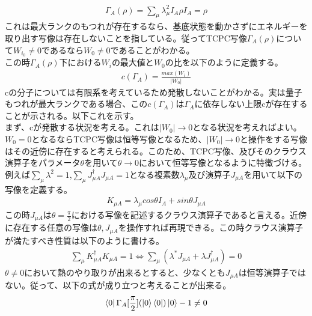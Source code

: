 \documentclass[a4paper,10.5pt]{article}
\numberwithin{equation}{section}
\begin{document}
\begin{equation}\begin{split}
    \Gamma_{A}(\rho)=\sum_{\mu}\lambda_{\mu}^{2}I_{A}\rho I_{A}
    =\rho
\end{split} \end{equation}
これは最大ランクのもつれが存在するなら、基底状態を動かさずにエネルギーを取り出す写像は存在しないことを指している。従ってTCPC写像$\Gamma_{A}(\rho)$について$W_{i_{0}}\neq 0$であるなら$W_{0}\neq 0$であることがわかる。\\
この時$\Gamma_{A}(\rho)$下における$W_{i}$の最大値と$W_{0}$の比を以下のように定義する。
\begin{equation}\begin{split}
    c(\Gamma_{A})=\frac{max(W_{i})}{|W_{0}|} \label{c}
\end{split} \end{equation}
cの分子については有限系を考えているため発散しないことがわかる。実は量子もつれが最大ランクである場合、この$c(\Gamma_{A})$は$\Gamma_{A}$に依存しない上限cが存在することが示される。以下これを示す。\\
まず、cが発散する状況を考える。これは$|W_{0}|\to 0$となる状況を考えればよい。$W_{0}=0$となるならTCPC写像は恒等写像となるため、$|W_{0}|\to 0$と操作をする写像はその近傍に存在すると考えられる。このため、TCPC写像、及びそのクラウス演算子をパラメータ$\theta$を用いて$\theta \to 0$において恒等写像となるように特徴づける。例えば$\sum_{\mu}\lambda^{2}=1$,$\sum_{\mu}J_{\mu A}^{\dagger} J_{\mu A}=1$となる複素数$\lambda_{\mu}$及び演算子$J_{\mu A}$を用いて以下の写像を定義する。
\begin{equation}\begin{split}
    K_{\mu A} = \lambda_{\mu}cos\theta I_{A} + sin\theta J_{\mu A}
\end{split} \end{equation}
この時$J_{\mu A}$は$\theta=\frac{\pi}{2}$における写像を記述するクラウス演算子であると言える。近傍に存在する任意の写像は$\theta,J_{\mu A}$を操作すれば再現できる。この時クラウス演算子が満たすべき性質は以下のように書ける。
\begin{equation}\begin{split}
    \sum_{\mu}K_{\mu A}^{\dagger}K_{\mu A}=1 
    \iff \sum_{\mu}(\lambda^{*}J_{\mu A}+\lambda J^{\dagger}_{\mu A})=0
\end{split} \end{equation}
$\theta \neq 0$において熱のやり取りが出来るとすると、少なくとも$J_{\mu A}$は恒等演算子ではない。従って、以下の式が成り立つと考えることが出来る。
\begin{equation}\begin{split}
    \bra{0}\Gamma_{A}[\frac{\pi}{2}](\ket{0}\bra{0})\ket{0}-1\neq 0
\end{split} \end{equation}
\end{document}
